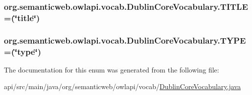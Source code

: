 \hypertarget{enumorg_1_1semanticweb_1_1owlapi_1_1vocab_1_1_dublin_core_vocabulary_acb8bfac585a3d798fdd0d1b663bd488d}{
\subsubsection[{T\-I\-T\-L\-E}]{\setlength{\rightskip}{0pt plus 5cm}org.\-semanticweb.\-owlapi.\-vocab.\-Dublin\-Core\-Vocabulary.\-T\-I\-T\-L\-E =(\char`\"{}title\char`\"{})}}\label{enumorg_1_1semanticweb_1_1owlapi_1_1vocab_1_1_dublin_core_vocabulary_acb8bfac585a3d798fdd0d1b663bd488d}
\hypertarget{enumorg_1_1semanticweb_1_1owlapi_1_1vocab_1_1_dublin_core_vocabulary_a94b31627419460af0d5b2d09949d76c7}{
\subsubsection[{T\-Y\-P\-E}]{\setlength{\rightskip}{0pt plus 5cm}org.\-semanticweb.\-owlapi.\-vocab.\-Dublin\-Core\-Vocabulary.\-T\-Y\-P\-E =(\char`\"{}type\char`\"{})}}\label{enumorg_1_1semanticweb_1_1owlapi_1_1vocab_1_1_dublin_core_vocabulary_a94b31627419460af0d5b2d09949d76c7}


The documentation for this enum was generated from the following file\-:\begin{DoxyCompactItemize}
\item 
api/src/main/java/org/semanticweb/owlapi/vocab/\hyperlink{_dublin_core_vocabulary_8java}{Dublin\-Core\-Vocabulary.\-java}\end{DoxyCompactItemize}
